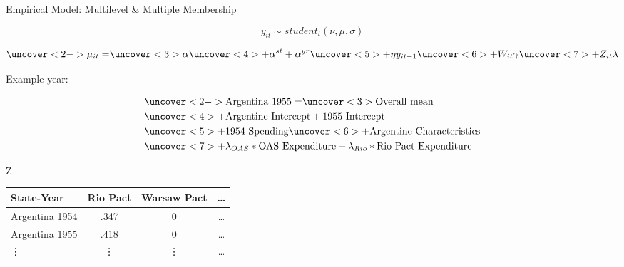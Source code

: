 \documentclass{beamer}
\begin{document}
 
\begin{frame}{Empirical Model: Multilevel \& Multiple Membership}
 

\begin{equation*} 
y_{it} \sim student_t(\nu, \mu, \sigma) 
\end{equation*}

\pause

\begin{equation*}
\uncover<2->{\mu_{it} =} \uncover<3>{\alpha} \uncover<4>{+ \alpha^{st} + \alpha^{yr}} \uncover<5>{+ \eta y_{it-1}} \uncover<6>{+ W_{it} \gamma} \uncover<7>{+ Z_{it} \lambda}
\end{equation*}

Example year: 

\begin{equation*}
\begin{split}
& \uncover<2->{\mbox{Argentina 1955} = } \uncover<3>{\mbox{Overall mean}} \\
& \uncover<4>{+ \mbox{Argentine Intercept} + \mbox{1955 Intercept}} \\
& \uncover<5>{+ \mbox{1954 Spending}} \uncover<6>{+ \mbox{Argentine Characteristics}} \\
& \uncover<7>{+ \lambda_{OAS} * \mbox{OAS Expenditure} + \lambda_{Rio} * \mbox{Rio Pact Expenditure}}
\end{split}
\end{equation*}



\end{frame}


\begin{frame}[standout]{Z} 

\begin{tabular}{lccc}
State-Year & Rio Pact & Warsaw Pact & \ldots \\
\hline
Argentina 1954 & .347 & 0 & \ldots \\
Argentina 1955 & .418  & 0 & \ldots  \\
 \vdots & \vdots & \vdots & \ldots  
\end{tabular}

 \end{frame}

\end{document}
